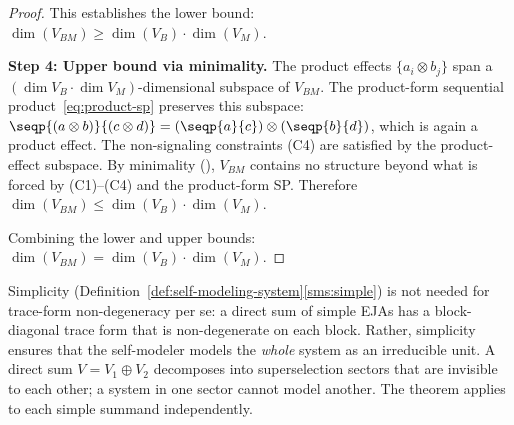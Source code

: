 \begin{proof}
This establishes the lower bound:
$\dim(V_{BM}) \geq \dim(V_{B}) \cdot \dim(V_{M})$.

\medskip
\textbf{Step 4: Upper bound via minimality.}
The product effects $\{a_{i} \otimes b_{j}\}$ span a
$(\dim V_{B} \cdot \dim V_{M})$-dimensional subspace of $V_{BM}$.
The product-form sequential product~\eqref{eq:product-sp} preserves
this subspace: $\seqp{(a \otimes b)}{(c \otimes d)} =
(\seqp{a}{c}) \otimes (\seqp{b}{d})$, which is again a product effect.
The non-signaling constraints (C4) are satisfied by the
product-effect subspace.  By
minimality (), $V_{BM}$ contains no
structure beyond what is forced by (C1)--(C4) and the product-form SP.
Therefore $\dim(V_{BM}) \leq \dim(V_{B}) \cdot \dim(V_{M})$.

\medskip
Combining the lower and upper bounds:
$\dim(V_{BM}) = \dim(V_{B}) \cdot \dim(V_{M})$.
\end{proof}

\begin{remark}
Simplicity (Definition~\ref{def:self-modeling-system}\ref{sms:simple})
is not needed for trace-form non-degeneracy per se: a direct sum
of simple EJAs has a block-diagonal trace form that is non-degenerate
on each block.  Rather, simplicity ensures that the self-modeler
models the \emph{whole} system as an irreducible unit.  A direct sum
$V = V_{1} \oplus V_{2}$ decomposes into superselection sectors that
are invisible to each other; a system in one sector cannot model
another.  The theorem applies to each simple summand independently.
\end{remark}
